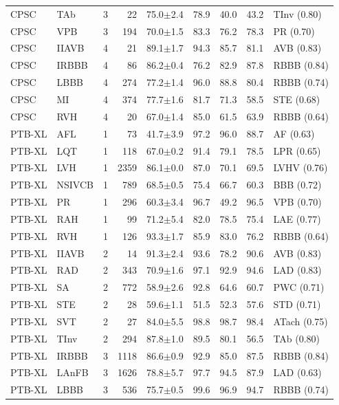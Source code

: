 \begin{longtable}{@{}llcrrrrrl@{}}
CPSC & TAb & 3 & 22 & 75.0$\pm$2.4 & 78.9 & 40.0 & 43.2 & TInv (0.80) \\
CPSC & VPB & 3 & 194 & 70.0$\pm$1.5 & 83.3 & 76.2 & 78.3 & PR (0.70) \\
CPSC & IIAVB & 4 & 21 & 89.1$\pm$1.7 & 94.3 & 85.7 & 81.1 & AVB (0.83) \\
CPSC & IRBBB & 4 & 86 & 86.2$\pm$0.4 & 76.2 & 82.9 & 87.8 & RBBB (0.84) \\
CPSC & LBBB & 4 & 274 & 77.2$\pm$1.4 & 96.0 & 88.8 & 80.4 & RBBB (0.74) \\
CPSC & MI & 4 & 374 & 77.7$\pm$1.6 & 81.7 & 71.3 & 58.5 & STE (0.68) \\
CPSC & RVH & 4 & 20 & 67.0$\pm$1.4 & 85.0 & 61.5 & 63.9 & RBBB (0.64) \\
PTB-XL & AFL & 1 & 73 & 41.7$\pm$3.9 & 97.2 & 96.0 & 88.7 & AF (0.63) \\
PTB-XL & LQT & 1 & 118 & 67.0$\pm$0.2 & 91.4 & 79.1 & 78.5 & LPR (0.65) \\
PTB-XL & LVH & 1 & 2359 & 86.1$\pm$0.0 & 87.0 & 70.1 & 69.5 & LVHV (0.76) \\
PTB-XL & NSIVCB & 1 & 789 & 68.5$\pm$0.5 & 75.4 & 66.7 & 60.3 & BBB (0.72) \\
PTB-XL & PR & 1 & 296 & 60.3$\pm$3.4 & 96.7 & 49.2 & 96.5 & VPB (0.70) \\
PTB-XL & RAH & 1 & 99 & 71.2$\pm$5.4 & 82.0 & 78.5 & 75.4 & LAE (0.77) \\
PTB-XL & RVH & 1 & 126 & 93.3$\pm$1.7 & 85.9 & 83.0 & 76.2 & RBBB (0.64) \\
PTB-XL & IIAVB & 2 & 14 & 91.3$\pm$2.4 & 93.6 & 78.2 & 90.6 & AVB (0.83) \\
PTB-XL & RAD & 2 & 343 & 70.9$\pm$1.6 & 97.1 & 92.9 & 94.6 & LAD (0.83) \\
PTB-XL & SA & 2 & 772 & 58.9$\pm$2.6 & 92.8 & 64.6 & 60.7 & PWC (0.71) \\
PTB-XL & STE & 2 & 28 & 59.6$\pm$1.1 & 51.5 & 52.3 & 57.6 & STD (0.71) \\
PTB-XL & SVT & 2 & 27 & 84.0$\pm$5.5 & 98.8 & 98.7 & 98.4 & ATach (0.75) \\
PTB-XL & TInv & 2 & 294 & 87.8$\pm$1.0 & 89.5 & 80.1 & 56.5 & TAb (0.80) \\
PTB-XL & IRBBB & 3 & 1118 & 86.6$\pm$0.9 & 92.9 & 85.0 & 87.5 & RBBB (0.84) \\
PTB-XL & LAnFB & 3 & 1626 & 78.8$\pm$5.7 & 97.7 & 94.5 & 87.9 & LAD (0.63) \\
PTB-XL & LBBB & 3 & 536 & 75.7$\pm$0.5 & 99.6 & 96.9 & 94.7 & RBBB (0.74) \\

\end{longtable}
